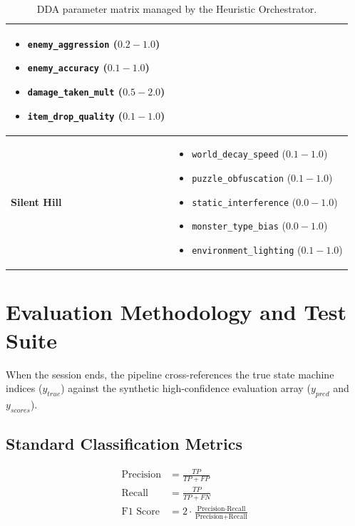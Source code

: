 \documentclass[11pt,a4paper]{article}
\begin{document}
\begin{table}[ht!]
{\begin{tabular}{@{} l >{\raggedright\arraybackslash}p{10cm} @{}}
\begin{itemize}
            \item \texttt{enemy\_aggression} ($0.2 - 1.0$)
            \item \texttt{enemy\_accuracy} ($0.1 - 1.0$)
            \item \texttt{damage\_taken\_mult} ($0.5 - 2.0$)
            \item \texttt{item\_drop\_quality} ($0.1 - 1.0$)
        \end{itemize} \\
        \midrule
        \textbf{Silent Hill} & 
        \begin{itemize}
            \item \texttt{world\_decay\_speed} ($0.1 - 1.0$)
            \item \texttt{puzzle\_obfuscation} ($0.1 - 1.0$)
            \item \texttt{static\_interference} ($0.0 - 1.0$)
            \item \texttt{monster\_type\_bias} ($0.0 - 1.0$)
            \item \texttt{environment\_lighting} ($0.1 - 1.0$)
        \end{itemize} \\
        \bottomrule
    \end{tabular}%
    }
    \caption{DDA parameter matrix managed by the Heuristic Orchestrator.}
    \label{tab:dda_params}
\end{table}

\section{Evaluation Methodology and Test Suite}

When the session ends, the pipeline cross-references the true state machine indices ($y_{true}$) against the synthetic high-confidence evaluation array ($y_{pred}$ and $y_{scores}$).

\subsection{Standard Classification Metrics}
\begin{align}
    \text{Precision} &= \frac{TP}{TP + FP} \\
    \text{Recall} &= \frac{TP}{TP + FN} \\
    \text{F1 Score} &= 2 \cdot \frac{\text{Precision} \cdot \text{Recall}}{\text{Precision} + \text{Recall}}
\end{align}
\end{document}
